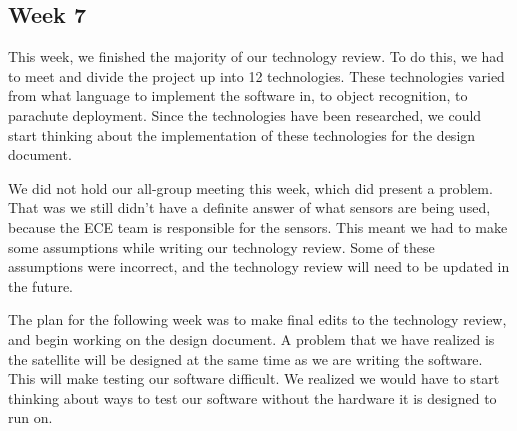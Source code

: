 \documentclass[10pt,letterpaper,onecolumn,draftclsnofoot,journal]{IEEEtran}
\begin{document}
\subsection{Week 7}
\par
This week, we finished the majority of our technology review. To do this, we had to meet and divide the project up into 12 technologies. These technologies varied from what language to implement the software in, to object recognition, to parachute deployment. Since the technologies have been researched, we could start thinking about the implementation of these technologies for the design document.\vspace{.3cm}
\par
We did not hold our all-group meeting this week, which did present a problem. That was we still didn't have a definite answer of what sensors are being used, because the ECE team is responsible for the sensors. This meant we had to make some assumptions while writing our technology review. Some of these assumptions were incorrect, and the technology review will need to be updated in the future.\vspace{.3cm}
\par
The plan for the following week was to make final edits to the technology review, and begin working on the design document. A problem that we have realized is the satellite will be designed at the same time as we are writing the software. This will make testing our software difficult. We realized we would have to start thinking about ways to test our software without the hardware it is designed to run on.\vspace{.3cm}
\end{document}
